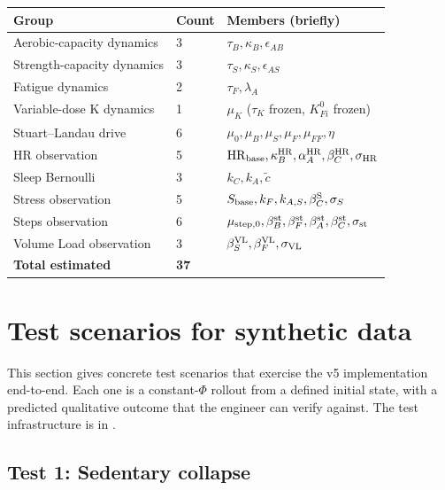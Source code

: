 \documentclass[11pt,a4paper]{article}
\theoremstyle{definition}
\begin{document}
\begin{center}\small
\begin{tabular}{lll}
\toprule
Group & Count & Members (briefly) \\
\midrule
Aerobic-capacity dynamics  & 3  & $\tau_B, \kappa_B, \epsilon_{AB}$ \\
Strength-capacity dynamics & 3  & $\tau_S, \kappa_S, \epsilon_{AS}$ \\
Fatigue dynamics           & 2  & $\tau_F, \lambda_A$ \\
Variable-dose K dynamics   & 1  & $\mu_K$ ($\tau_K$ frozen, $K^0_{Fi}$ frozen) \\
Stuart--Landau drive       & 6  & $\mu_0, \mu_B, \mu_S, \mu_F, \mu_{FF}, \eta$ \\
HR observation             & 5  & ${\rm HR}_{\rm base}, \kappa_B^{\rm HR}, \alpha_A^{\rm HR}, \beta_C^{\rm HR}, \sigma_{\rm HR}$ \\
Sleep Bernoulli            & 3  & $k_C, k_A, \tilde c$ \\
Stress observation         & 5  & $S_{\rm base}, k_F, k_{A,S}, \beta_C^{\rm S}, \sigma_S$ \\
Steps observation          & 6  & $\mu_{\rm step,0}, \beta_B^{\rm st}, \beta_F^{\rm st}, \beta_A^{\rm st}, \beta_C^{\rm st}, \sigma_{\rm st}$ \\
Volume Load observation    & 3  & $\beta_S^{\rm VL}, \beta_F^{\rm VL}, \sigma_{\rm VL}$ \\
\midrule
\textbf{Total estimated}   & \textbf{37} & \\
\bottomrule
\end{tabular}
\end{center}


\section{Test scenarios for synthetic data} \label{sec:tests}

This section gives concrete test scenarios that exercise the v5
implementation end-to-end. Each one is a constant-$\Phi$ rollout from a
defined initial state, with a predicted qualitative outcome that the
engineer can verify against. The test infrastructure is in
.

\subsection{Test 1: Sedentary collapse}
\end{document}
